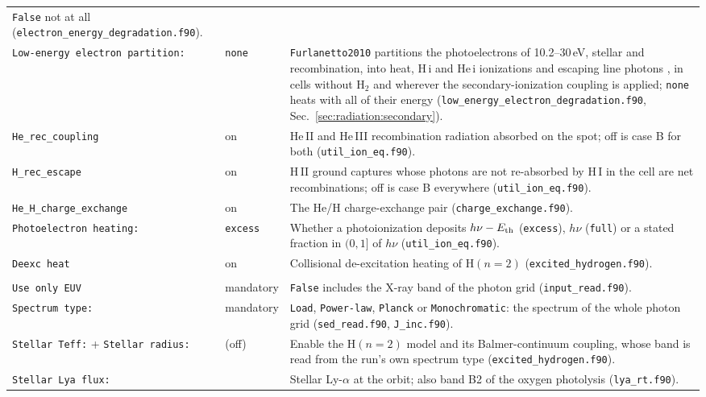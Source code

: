 {\begin{longtable}{@{}>{\raggedright\arraybackslash}p{}>{\raggedright\arraybackslash}p{}>{\raggedright\arraybackslash}p{}@{}}
  \texttt{False} not at all
  (\texttt{electron\_energy\_degradation.f90}). \\
\texttt{Low-energy electron partition:} & \texttt{none} &
  \texttt{Furlanetto2010} partitions the photoelectrons of 10.2--30\,eV,
  stellar and recombination, into heat, H\,{\sc i} and He\,{\sc i}
  ionizations and escaping line photons \citep{Furlanetto2010}, in cells
  without H$_2$ and wherever the secondary-ionization coupling is applied;
  \texttt{none} heats with all of their energy
  (\texttt{low\_energy\_electron\_degradation.f90},
  Sec.~\ref{sec:radiation:secondary}). \\
\texttt{He\_rec\_coupling} & on &
  He\,II and He\,III recombination radiation absorbed on the spot; off is
  case B for both (\texttt{util\_ion\_eq.f90}). \\
\texttt{H\_rec\_escape} & on &
  H\,II ground captures whose photons are not re-absorbed by H\,I in the
  cell are net recombinations; off is case B everywhere
  (\texttt{util\_ion\_eq.f90}). \\
\texttt{He\_H\_charge\_exchange} & on &
  The He/H charge-exchange pair (\texttt{charge\_exchange.f90}). \\
\texttt{Photoelectron heating:} & \texttt{excess} &
  Whether a photoionization deposits $h\nu - E_{\rm th}$ (\texttt{excess}),
  $h\nu$ (\texttt{full}) or a stated fraction in $(0,1]$ of $h\nu$
  (\texttt{util\_ion\_eq.f90}). \\
\texttt{Deexc heat} & on &
  Collisional de-excitation heating of $\mathrm{H}(n{=}2)$
  (\texttt{excited\_hydrogen.f90}). \\
\midrule
\multicolumn{3}{l}{\itshape Radiation field}\\
\midrule
\texttt{Use only EUV} & mandatory &
  \texttt{False} includes the X-ray band of the photon grid
  (\texttt{input\_read.f90}). \\
\texttt{Spectrum type:} & mandatory &
  \texttt{Load}, \texttt{Power-law}, \texttt{Planck} or
  \texttt{Monochromatic}: the spectrum of the whole photon grid
  (\texttt{sed\_read.f90}, \texttt{J\_inc.f90}). \\
\texttt{Stellar Teff:} + \texttt{Stellar radius:} & 0 (off) &
  Enable the $\mathrm{H}(n{=}2)$ model and its Balmer-continuum coupling,
  whose band is read from the run's own spectrum type
  (\texttt{excited\_hydrogen.f90}). \\
\texttt{Stellar Lya flux:} & 0 &
  Stellar Ly-$\alpha$ at the orbit; also band B2 of the oxygen photolysis
  (\texttt{lya\_rt.f90}). \\

\end{longtable}}
